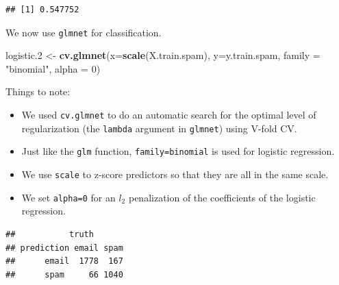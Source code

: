 \documentclass[]{book}
\newenvironment{Shaded}{\begin{snugshade}}{\end{snugshade}}
\newcommand{\KeywordTok}[1]{\textcolor[rgb]{0.13,0.29,0.53}{\textbf{#1}}}
\newcommand{\DataTypeTok}[1]{\textcolor[rgb]{0.13,0.29,0.53}{#1}}
\newcommand{\DecValTok}[1]{\textcolor[rgb]{0.00,0.00,0.81}{#1}}
\newcommand{\StringTok}[1]{\textcolor[rgb]{0.31,0.60,0.02}{#1}}
\newcommand{\CommentTok}[1]{\textcolor[rgb]{0.56,0.35,0.01}{\textit{#1}}}
\newcommand{\OperatorTok}[1]{\textcolor[rgb]{0.81,0.36,0.00}{\textbf{#1}}}
\newcommand{\NormalTok}[1]{#1}
\providecommand{\tightlist}{%
  \setlength{\itemsep}{0pt}\setlength{\parskip}{0pt}}
\theoremstyle{definition}
\theoremstyle{definition}
\theoremstyle{definition}
\theoremstyle{remark}
\begin{document}
\begin{verbatim}
## [1] 0.547752
\end{verbatim}

We now use \texttt{glmnet} for classification.

\begin{Shaded}
\begin{Highlighting}[]
\NormalTok{logistic.}\DecValTok{2}\NormalTok{ <-}\StringTok{ }\KeywordTok{cv.glmnet}\NormalTok{(}\DataTypeTok{x=}\KeywordTok{scale}\NormalTok{(X.train.spam), }\DataTypeTok{y=}\NormalTok{y.train.spam, }\DataTypeTok{family =} \StringTok{"binomial"}\NormalTok{, }\DataTypeTok{alpha =} \DecValTok{0}\NormalTok{)}
\end{Highlighting}
\end{Shaded}

Things to note:

\begin{itemize}
\tightlist
\item
  We used \texttt{cv.glmnet} to do an automatic search for the optimal
  level of regularization (the \texttt{lambda} argument in
  \texttt{glmnet}) using V-fold CV.
\item
  Just like the \texttt{glm} function,
  \texttt{family=\textquotesingle{}binomial\textquotesingle{}} is used
  for logistic regression.
\item
  We use \texttt{scale} to z-score predictors so that they are all in
  the same scale.
\item
  We set \texttt{alpha=0} for an \(l_2\) penalization of the
  coefficients of the logistic regression.
\end{itemize}

\begin{Shaded}
\end{Shaded}

\begin{verbatim}
##           truth
## prediction email spam
##      email  1778  167
##      spam     66 1040
\end{verbatim}
\end{document}
